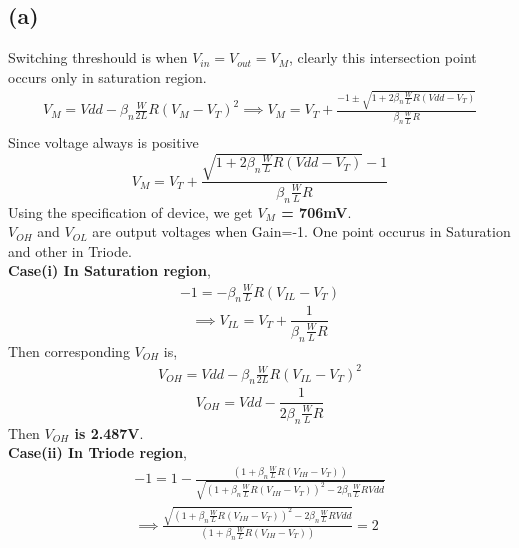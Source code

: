 \documentclass{article}
\begin{document}
\subsection*{(a)}
Switching threshould is when $V_{in} = V_{out} = V_{M}$, clearly this intersection point occurs only in saturation region.
\begin{gather*}
V_{M} = Vdd - {{\beta}_n}{\frac{W}{2L}}R(V_{M} - V_T)^2
\implies V_{M} = V_T + \frac{-1 \pm \sqrt{1 + 2{{\beta}_n}{\frac{W}{L}}R(Vdd-V_T)}}{{{\beta}_n}{\frac{W}{L}}R}\\
\end{gather*}
Since voltage always is positive
\begin{equation} \label{eq:vm}
V_{M} = V_T + \frac{\sqrt{1 + 2{{\beta}_n}{\frac{W}{L}}R(Vdd-V_T)}-1}{{{\beta}_n}{\frac{W}{L}}R}
\end{equation}
Using the specification of device, we get \textbf{$V_M$ = 706mV}.\\
 \newline
$V_{OH}$ and $V_{OL}$ are output voltages when Gain=-1. One point occurus in Saturation and other in Triode.\\
\textbf{Case(i) In Saturation region},\\
\begin{gather*}
-1 = -{{\beta}_n}{\frac{W}{L}}R(V_{IL}-V_T)
\end{gather*}
\begin{equation} \label{eq:vil}
\implies V_{IL} = V_T + \frac{1}{{{\beta}_n}{\frac{W}{L}}R}
\end{equation}
Then corresponding $V_{OH}$ is,
\begin{gather*}
V_{OH} = Vdd - {{\beta}_n}{\frac{W}{2L}}R(V_{IL} - V_T)^2
\end{gather*}
\begin{equation} \label{eq:voh}
	V_{OH} = Vdd - \frac{1}{2{{\beta}_n}{\frac{W}{L}}R}
\end{equation}
Then \textbf{$V_{OH}$ is 2.487V}.\\
 \newline
\textbf{Case(ii) In Triode region},\\
\begin{gather*}
-1 = 1 - \frac{\left(1 + {{\beta}_n}{\frac{W}{L}}R(V_{IH} - V_T)\right)}{\sqrt{\left(1 + {{\beta}_n}{\frac{W}{L}}R(V_{IH} - V_T)\right)^2 - 2{{\beta}_n}{\frac{W}{L}}RVdd}}\\
\implies \frac{\sqrt{\left(1 + {{\beta}_n}{\frac{W}{L}}R(V_{IH} - V_T)\right)^2 - 2{{\beta}_n}{\frac{W}{L}}RVdd}}{\left(1 + {{\beta}_n}{\frac{W}{L}}R(V_{IH} - V_T)\right)} = 2
\end{gather*}
\end{document}
